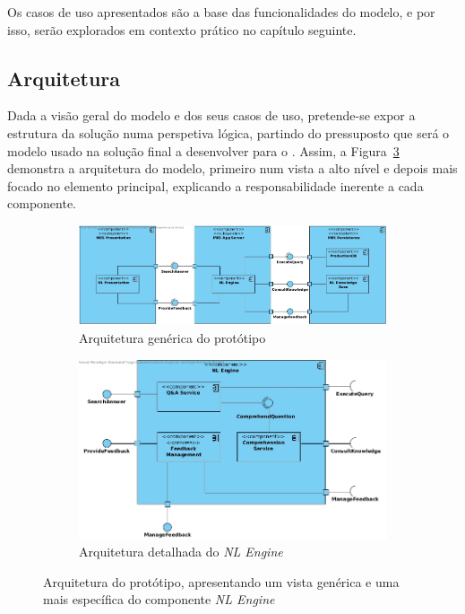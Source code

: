 Os casos de uso apresentados são a base das funcionalidades do modelo, e por isso, serão explorados em contexto prático no capítulo seguinte.

\subsection{Arquitetura}
Dada a visão geral do modelo e dos seus casos de uso, pretende-se expor a estrutura da solução numa perspetiva lógica, partindo do pressuposto que será o modelo usado na solução final a desenvolver para o {\productname}. Assim, a Figura~\ref{fig:prototype_architecture} demonstra a arquitetura do modelo, primeiro num vista a alto nível e depois mais focado no elemento principal, explicando a responsabilidade inerente a cada componente.
%
\begin{figure}
\centering
    \begin{subfigure}{\textwidth}
         \centering
         \includegraphics[width=\textwidth]{ch04/assets/generic-architecture.jpg}
         \caption{Arquitetura genérica do protótipo}
         \label{fig:generic_architecture}
     \end{subfigure}
     \bigbreak
     \bigbreak
     \begin{subfigure}{\textwidth}
         \centering
         \includegraphics[width=\textwidth]{ch04/assets/nl-engine.jpg}
         \caption{Arquitetura detalhada do \textit{NL Engine}}
         \label{fig:nlengine_architecture}
     \end{subfigure}
\caption{Arquitetura do protótipo, apresentando um vista genérica e uma mais específica do componente \textit{NL Engine}}
\label{fig:prototype_architecture}
\end{figure}

